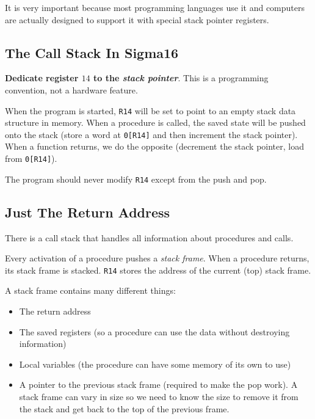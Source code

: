 It is very important because most programming languages use it and computers are actually designed to support it with special stack pointer registers.

\subsection{The Call Stack In Sigma16}\label{sub:the_call_stack_in_sigma16}

\textbf{Dedicate register \(14\) to the \emph{stack pointer}}.
This is a programming convention, not a hardware feature.

When the program is started, \texttt{R14} will be set to point to an empty stack data structure in memory.
When a procedure is called, the saved state will be pushed onto the stack (store a word at \texttt{0[R14]} and then increment the stack pointer).
When a function returns, we do the opposite (decrement the stack pointer, load from \texttt{0[R14]}).

The program should never modify \texttt{R14} except from the push and pop.

\subsection{Just The Return Address}\label{sub:just_the_return_address}

There is a call stack that handles all information about procedures and calls.

Every activation of a procedure pushes a \emph{stack frame}.
When a procedure returns, its stack frame is stacked.
\texttt{R14} stores the address of the current (top) stack frame.

A stack frame contains many different things:
\begin{itemize}
    \item The return address
    \item The saved registers (so a procedure can use the data without destroying information)
    \item Local variables (the procedure can have some memory of its own to use)
    \item A pointer to the previous stack frame (required to make the pop work).
          A stack frame can vary in size so we need to know the size to remove it from the stack and get back to the top of the previous frame.
\end{itemize}
